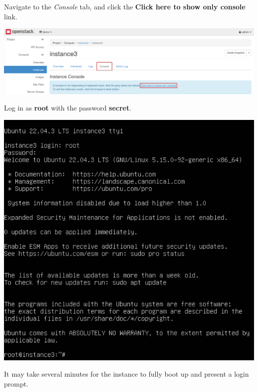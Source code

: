 \documentclass[letterpaper, 12pt]{article}
\begin{document}
\begin{enumerate}
    \begin{labstep}
        Navigate to the \textit{Console} tab, and click the \textbf{Click here to show only console} link.

        \begin{center}
            \includegraphics[width=\linewidth]{images/part3/step5.png}
        \end{center}
    \end{labstep}

    \begin{labstep}
        Log in as \textbf{root} with the password \textbf{secret}.

        \begin{center}
            \includegraphics[width=\linewidth]{images/part3/step6.png}
        \end{center}
    \end{labstep}

    \begin{notebox}
        It may take several minutes for the instance to fully boot up and present a login prompt.
    \end{notebox}


\end{enumerate}
\end{document}
